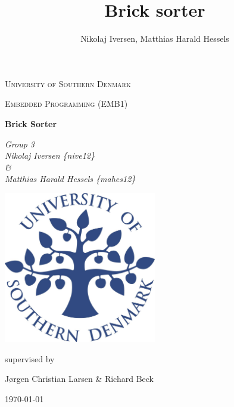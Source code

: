 \documentclass[a4paper,10pt]{article}
\title{Brick sorter}
\author{Nikolaj Iversen, Matthias Harald Hessels}
\begin{document}
\begin{titlepage}
	\centering
	{\scshape\LARGE University of Southern Denmark \par}
	\vspace{1cm}
	{\scshape\Large Embedded Programming (EMB1) \par}
	\vspace{1.5cm}
	{\huge\bfseries Brick Sorter\par}
	\vspace{2cm}
	{\Large\itshape Group 3 \\ Nikolaj Iversen \{nive12\} \\ \& \\ Matthias Harald Hessels \{mahes12\} \par}
	\vspace{1cm}
	\centering
	\includegraphics[width=0.5\textwidth]{img/sdu}\par
	\vfill
	supervised by\par
	Jørgen Christian Larsen \& Richard Beck
	\vfill

	{\large \today\par}
\end{titlepage}

\tableofcontents
\listoftodos
\thispagestyle{empty}
\addtocounter{page}{-1}
\newpage





\newpage



\newpage

\end{document}
